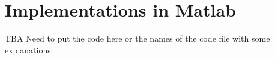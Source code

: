 \section{Implementations in Matlab}\label{app:A}
TBA
Need to put the code here or the names of the code file with some explanations.